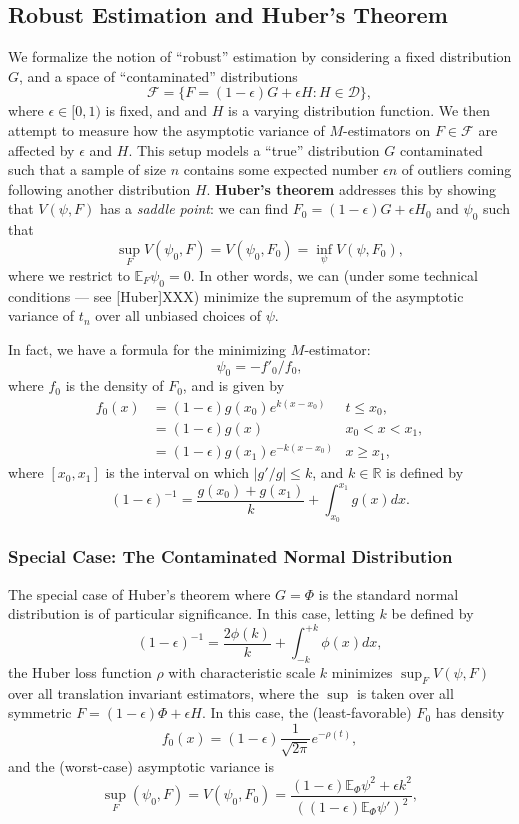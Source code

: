 \documentclass[reqno]{amsart}
\numberwithin{equation}{section}
\begin{document}
\subsection{Robust Estimation and Huber's Theorem}

We formalize the notion of ``robust'' estimation by considering a fixed distribution $G$, and a space
of ``contaminated'' distributions
$$
    \mathcal F = \{F = (1 - \epsilon) G + \epsilon H : H \in \mathcal D\},
$$
where $\epsilon \in [0, 1)$ is fixed, and
and $H$ is a varying distribution function. We then attempt to measure how the asymptotic
variance of $M$-estimators on $F \in \mathcal{F}$ are affected by $\epsilon$ and $H$. This setup models a
``true'' distribution $G$ contaminated such that a sample of size $n$ contains
some expected number $\epsilon n$ of outliers coming following
another distribution $H$. \textbf{Huber's theorem} addresses this by showing that $V(\psi, F)$ has a
\emph{saddle point}: we can find $F_0 = (1 - \epsilon) G + \epsilon H_0$ and $\psi_0$ such that
$$
    \sup_F V(\psi_0, F) = V(\psi_0, F_0) = \inf_{\psi} V(\psi, F_0),
$$
where we restrict to $\mathbb E_F \psi_0 = 0$. In other words, we can (under some technical conditions --- see
[Huber]XXX) minimize the supremum of the asymptotic variance of $t_n$ over all unbiased choices of $\psi$.

In fact, we have a formula for the minimizing $M$-estimator:
$$
    \psi_0 = -f'_0 / f_0,
$$
where $f_0$ is the density of $F_0$, and is given by
\begin{align*}
    f_0(x) &= (1 - \epsilon) g(x_0) e^{k(x - x_0)} & t \le x_0, \\
           &= (1 - \epsilon) g(x) & x_0 < x < x_1, \\
           &= (1 - \epsilon) g(x_1) e^{-k(x - x_0)} & x \ge x_1,
\end{align*}
where $[x_0, x_1]$ is the interval on which $|g'/g| \le k$, and $k \in \mathbb R$ is defined by
$$
    (1 - \epsilon)^{-1} = \frac{g(x_0) + g(x_1)}{k} + \int_{x_0}^{x_1} g(x) dx.
$$

\subsubsection{Special Case: The Contaminated Normal Distribution}

The special case of Huber's theorem where $G = \Phi$ is the standard normal distribution is of
particular significance. In this case, letting $k$ be defined by
$$
    (1 - \epsilon)^{-1} = \frac{2 \phi(k)}{k} + \int_{-k}^{+k} \phi(x) dx,
$$
the Huber loss function $\rho$ with characteristic scale $k$ minimizes
$\sup_F V(\psi, F)$ over all translation invariant estimators, where the $\sup$ is taken over all
symmetric $F = (1 - \epsilon) \Phi + \epsilon H$. In this case, the (least-favorable) $F_0$ has density
$$
    f_0(x) = (1 - \epsilon) \frac{1}{\sqrt{2 \pi}} e^{-\rho(t)},
$$
and the (worst-case) asymptotic variance is
$$
    \sup_F(\psi_0, F) = V(\psi_0, F_0) =
    \frac{(1 - \epsilon) \mathbb E_{\Phi} \psi^2 + \epsilon k^2}{\left( (1 - \epsilon) \mathbb E_{\Phi}\psi'\right)^2},
$$
\end{document}
